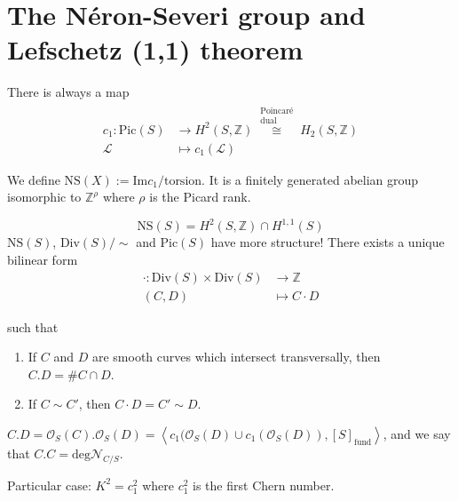 \section{The Néron-Severi group and Lefschetz
(1,1) theorem}
\label{section-neron-severi}

\noindent
There is always a map
$$
\begin{aligned}
c_1: \text{Pic}(S) &\longrightarrow
H^2(S,\mathbb{Z})
\overset{\substack{\text{Poincaré} \\
\text{dual}}}{\cong}
H_2(S,\mathbb{Z}) \\
\mathcal{L} &\longmapsto c_1(\mathcal{L})
\end{aligned}
$$

\noindent
We define
$\text{NS}(X):=\text{Im}c_1/\text{torsion}$.
It is a finitely generated abelian group
isomorphic to $\mathbb{Z}^{\rho}$
where $\rho$ is the Picard rank.


\begin{theorem}
\label{theorem-form}
$$
\text{NS}(S)=H^2(S,\mathbb{Z})\cap H^{1,1}(S)
$$
$\text{NS}(S)$, $\text{Div}(S)/\sim$ and
$\text{Pic}(S)$
have more structure!
There exists a unique bilinear form
$$
\begin{aligned}
\cdot: \text{Div}(S)\times \text{Div}(S)
&\longrightarrow \mathbb{Z} \\
(C,D) &\longmapsto C\cdot D
\end{aligned}
$$

\noindent
such that
\begin{enumerate}
\item If $C $ and $D$ are smooth curves which
intersect
transversally, then $C.D=\# C \cap D$.
\item If $C \sim C'$, then $C\cdot D = C'
\sim D$.
\end{enumerate}
\end{theorem}

\begin{definition}
\label{definition-form}
$C.D=\mathcal{O}_S(C).\mathcal{O}_S(D)
=\left\langle{}c_1(\mathcal{O}_S(D) \cup
c_1(\mathcal{O}_S(D)),
[S]_{\text{fund}}\right\rangle{}$,
and we say that $C.C=\text{deg}
\mathcal{N}_{C/S}$.
\end{definition}

Particular case: $K^2=c_1^2$
where $c_1^2$ is the first Chern number.


